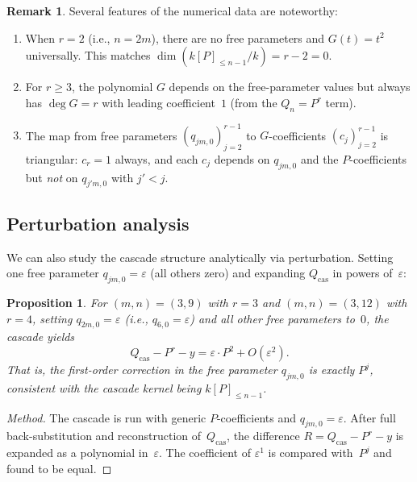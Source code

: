 \documentclass[12pt,a4paper]{article}
\newtheorem{proposition}[theorem]{Proposition}
\theoremstyle{definition}
\newtheorem{remark}[theorem]{Remark}
\newcommand{\kk}{k}
\begin{document}
\begin{remark}
Several features of the numerical data are noteworthy:
\begin{enumerate}
\item When $r = 2$ (i.e., $n = 2m$), there are no free parameters and
  $G(t) = t^2$ universally. This matches
  $\dim(\kk[P]_{\leq n-1}/\kk) = r - 2 = 0$.
\item For $r \geq 3$, the polynomial $G$ depends on the free-parameter
  values but always has $\deg G = r$ with leading coefficient~$1$
  (from the $Q_n = P^r$ term).
\item The map from free parameters $(q_{jm,0})_{j=2}^{r-1}$ to
  $G$-coefficients $(c_j)_{j=2}^{r-1}$ is triangular: $c_r = 1$ always,
  and each $c_j$ depends on $q_{jm,0}$ and the $P$-coefficients but
  \emph{not} on $q_{j'm,0}$ with $j' < j$.
\end{enumerate}
\end{remark}

\subsection{Perturbation analysis}\label{sec:perturbation}

We can also study the cascade structure analytically via perturbation.
Setting one free parameter $q_{jm,0} = \varepsilon$ (all others zero)
and expanding $Q_{\mathrm{cas}}$ in powers of~$\varepsilon$:

\begin{proposition}\label{prop:perturbation}
For $(m,n) = (3,9)$ with $r = 3$ and $(m,n) = (3,12)$ with $r = 4$,
setting $q_{2m,0} = \varepsilon$ (i.e., $q_{6,0} = \varepsilon$) and all
other free parameters to~$0$, the cascade yields
\[
  Q_{\mathrm{cas}} - P^r - y = \varepsilon \cdot P^2 + O(\varepsilon^2).
\]
That is, the first-order correction in the free parameter $q_{jm,0}$ is
exactly $P^j$, consistent with the cascade kernel being $\kk[P]_{\leq n-1}$.
\end{proposition}

\begin{proof}[Method]
The cascade is run with generic $P$\nobreakdash-coefficients and
$q_{jm,0} = \varepsilon$. After full back-substitution and reconstruction
of~$Q_{\mathrm{cas}}$, the difference $R = Q_{\mathrm{cas}} - P^r - y$ is
expanded as a polynomial in~$\varepsilon$. The coefficient of
$\varepsilon^1$ is compared with~$P^j$ and found to be equal.
\end{proof}
\end{document}
